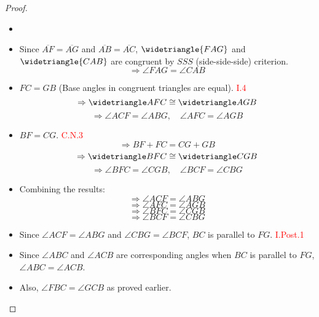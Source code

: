 \begin{proof}

\begin{itemize}
\item[]
	\item Since $\overline{AF} = \overline{AG}$ and $\overline{AB} = \overline{AC}$,  $\widetriangle{FAG}$ and $\widetriangle{ CAB}$ are congruent by $SSS$ (side-side-side) criterion.
        		\[\Rightarrow \angle{FAG} = \angle{CAB}\]
	\item $FC = GB$ (Base angles in congruent triangles are equal).\hfill\textcolor{red}{ I.4}
        		\[\Rightarrow \widetriangle AFC \cong \widetriangle AGB\]
        		\[\Rightarrow \angle{ACF} = \angle{ABG}, \quad \angle{AFC} = \angle{AGB}\]
	\item $BF = CG$. \hfill\textcolor{red}{ C.N.3}
        		\[\Rightarrow BF + FC = CG + GB\]
        		\[\Rightarrow \widetriangle BFC \cong \widetriangle CGB\]
        		\[\Rightarrow \angle{BFC} = \angle{CGB}, \quad \angle{BCF} = \angle{CBG}\]
	\item Combining the results:
        		\[\Rightarrow \angle{ACF} = \angle{ABG}\]
        		\[\Rightarrow \angle{AFC} = \angle{AGB}\]
        		\[\Rightarrow \angle{BFC} = \angle{CGB}\]
        		\[\Rightarrow \angle{BCF} = \angle{CBG}\]
	\item Since $\angle{ACF} = \angle{ABG}$ and $\angle{CBG} = \angle{BCF}$,  $BC$ is parallel to $FG$. \hfill\textcolor{red}{ I.Post.1}
	
\clearpage
	
	\item Since $\angle{ABC}$ and $\angle{ACB}$ are corresponding angles when $BC$ is parallel to $FG$, $\angle{ABC} = \angle{ACB}$.
	
	\item Also, $\angle{FBC} = \angle{GCB}$ as proved earlier.
\end{itemize}


\end{proof}
